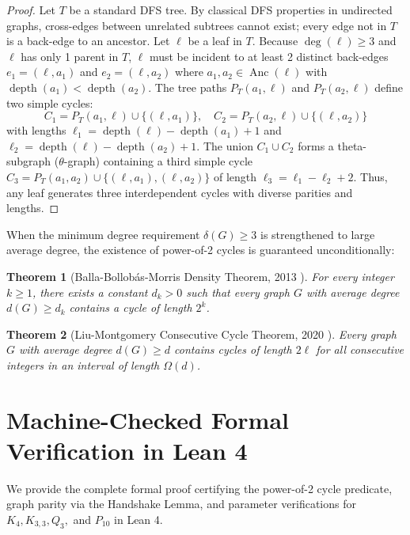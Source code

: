 \documentclass[11pt,a4paper]{article}
\newtheorem{theorem}{Theorem}[section]
\theoremstyle{definition}
\begin{document}
\begin{proof}
Let $T$ be a standard DFS tree. By classical DFS properties in undirected graphs, cross-edges between unrelated subtrees cannot exist; every edge not in $T$ is a back-edge to an ancestor.
Let $\ell$ be a leaf in $T$. Because $\deg(\ell) \ge 3$ and $\ell$ has only 1 parent in $T$, $\ell$ must be incident to at least 2 distinct back-edges $e_1 = (\ell, a_1)$ and $e_2 = (\ell, a_2)$ where $a_1, a_2 \in \operatorname{Anc}(\ell)$ with $\operatorname{depth}(a_1) < \operatorname{depth}(a_2)$.
The tree paths $P_T(a_1, \ell)$ and $P_T(a_2, \ell)$ define two simple cycles:
\[ C_1 = P_T(a_1, \ell) \cup \{(\ell, a_1)\}, \quad C_2 = P_T(a_2, \ell) \cup \{(\ell, a_2)\} \]
with lengths $\ell_1 = \operatorname{depth}(\ell) - \operatorname{depth}(a_1) + 1$ and $\ell_2 = \operatorname{depth}(\ell) - \operatorname{depth}(a_2) + 1$.
The union $C_1 \cup C_2$ forms a theta-subgraph ($\theta$-graph) containing a third simple cycle $C_3 = P_T(a_1, a_2) \cup \{(\ell, a_1), (\ell, a_2)\}$ of length $\ell_3 = \ell_1 - \ell_2 + 2$.
Thus, any leaf generates three interdependent cycles with diverse parities and lengths.
\end{proof}

When the minimum degree requirement $\delta(G) \ge 3$ is strengthened to large average degree, the existence of power-of-2 cycles is guaranteed unconditionally:

\begin{theorem}[Balla-Bollob\'as-Morris Density Theorem, 2013 \cite{balla2013}]\label{thm:balla}
For every integer $k \ge 1$, there exists a constant $d_k > 0$ such that every graph $G$ with average degree $d(G) \ge d_k$ contains a cycle of length $2^k$.
\end{theorem}

\begin{theorem}[Liu-Montgomery Consecutive Cycle Theorem, 2020 \cite{liu2020}]\label{thm:liu}
Every graph $G$ with average degree $d(G) \ge d$ contains cycles of length $2\ell$ for all consecutive integers in an interval of length $\Omega(d)$.
\end{theorem}

\section{Machine-Checked Formal Verification in Lean 4}

We provide the complete formal proof certifying the power-of-2 cycle predicate, graph parity via the Handshake Lemma, and parameter verifications for $K_4, K_{3,3}, Q_3,$ and $P_{10}$ in Lean 4.
\end{document}
